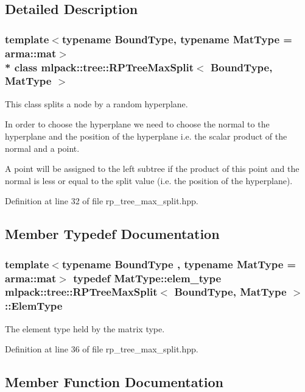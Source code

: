 \subsection{Detailed Description}
\subsubsection*{template$<$typename Bound\+Type, typename Mat\+Type = arma\+::mat$>$\\*
class mlpack\+::tree\+::\+R\+P\+Tree\+Max\+Split$<$ Bound\+Type, Mat\+Type $>$}

This class splits a node by a random hyperplane. 

In order to choose the hyperplane we need to choose the normal to the hyperplane and the position of the hyperplane i.\+e. the scalar product of the normal and a point.

A point will be assigned to the left subtree if the product of this point and the normal is less or equal to the split value (i.\+e. the position of the hyperplane). 

Definition at line 32 of file rp\+\_\+tree\+\_\+max\+\_\+split.\+hpp.



\subsection{Member Typedef Documentation}
\subsubsection[{Elem\+Type}]{\setlength{\rightskip}{0pt plus 5cm}template$<$typename Bound\+Type , typename Mat\+Type  = arma\+::mat$>$ typedef Mat\+Type\+::elem\+\_\+type {\bf mlpack\+::tree\+::\+R\+P\+Tree\+Max\+Split}$<$ Bound\+Type, Mat\+Type $>$\+::{\bf Elem\+Type}}\label{classmlpack_1_1tree_1_1RPTreeMaxSplit_a85936c73cab84e8bee94aeb920b202a1}


The element type held by the matrix type. 



Definition at line 36 of file rp\+\_\+tree\+\_\+max\+\_\+split.\+hpp.



\subsection{Member Function Documentation}
